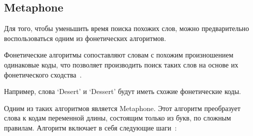 \subsection{Metaphone}\label{Metaphone}

Для того, чтобы уменьшить время поиска похожих слов, можно предварительно воспользоваться одним из фонетических алгоритмов.

Фонетические алгоритмы сопоставляют словам с похожим произношением одинаковые коды, что позволяет производить поиск таких слов на основе их фонетического сходства~\cite{phonetic}.

Например, слова `Desert' и `Dessert' будут иметь схожие фонетические коды.

Одним из таких алгоритмов является Metaphone. Этот алгоритм преобразует слова к кодам переменной длины, состоящим только из букв, по сложным правилам. Алгоритм включает в себя следующие шаги~\cite{phonetic2}:

